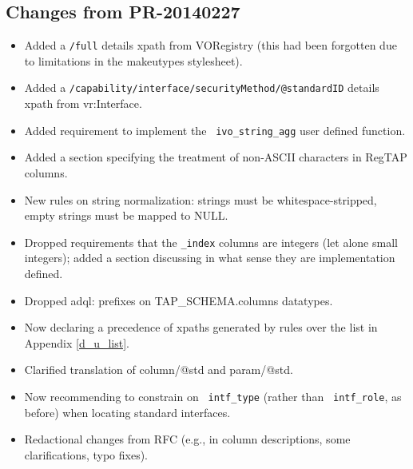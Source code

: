 \documentclass[11pt,a4paper]{ivoa}
\newcommand{\rtent}[1]{\texttt{\color{rtcolor} #1}}
\begin{document}
\subsection{Changes from PR-20140227}

\label{changes-20140227}

\begin{itemize}

\item Added a \texttt{/full} details xpath from VORegistry (this had
  been forgotten due to limitations in the makeutypes stylesheet).{}

\item Added a \texttt{/capability/interface/securityMethod/@standardID}
  details xpath from vr:Interface.{}

\item Added requirement to implement the \rtent{ivo\_string\_agg}
  user defined function.{}

\item Added a section specifying the treatment of non-ASCII characters
  in RegTAP columns.{}

\item New rules on string normalization: strings must be
  whitespace-stripped, empty strings must be mapped to NULL.{}

\item Dropped requirements that the \texttt{\_index} columns are
  integers (let alone small integers); added a section discussing in
  what sense they are implementation defined.{}

\item Dropped adql: prefixes on TAP\_SCHEMA.columns datatypes.{}

\item Now declaring a precedence of xpaths generated by rules over the
  list in Appendix \ref{d_u_list}.{}

\item Clarified translation of column/@std and param/@std.{}

\item Now recommending to constrain on \rtent{intf\_type}
  (rather than \rtent{intf\_role}, as before) when locating standard
  interfaces.{}

\item Redactional changes from RFC (e.g., in column descriptions, some 
  clarifications, typo fixes).{}


\end{itemize}
\end{document}
